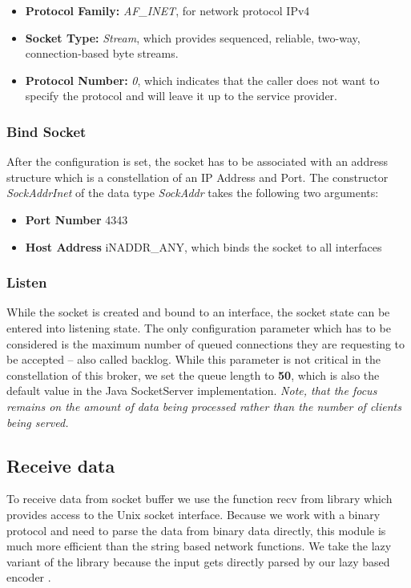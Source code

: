 \begin{itemize}
    \item {\bf Protocol Family:} \textit{AF\_INET}, for network protocol IPv4
    \item {\bf Socket Type:} \textit{Stream}, which provides sequenced, reliable, two-way, connection-based byte streams.
    \item {\bf Protocol Number:} \textit{0}, which indicates that the caller does not want to specify the protocol and will leave it up to the service provider.
\end{itemize}


\subsubsection{Bind Socket}

After the configuration is set, the socket has to be associated with an address
structure which is a constellation of an IP Address and Port. The constructor
\textit{SockAddrInet} of the data type \textit{SockAddr} takes the following
two arguments:

\begin{itemize}
    \item {\bf Port Number} 4343
    \item {\bf Host Address} iNADDR\_ANY, which binds the socket to all interfaces
\end{itemize}


\subsubsection{Listen}

While the socket is created and bound to an interface, the socket state can be
entered into listening state. The only configuration parameter which has to be
considered is the maximum number of queued connections they are requesting to
be accepted -- also called backlog. While this parameter is not critical in the
constellation of this broker, we set the queue length to \textbf{50}, which is
also the default value in the Java SocketServer implementation. \textit{Note,
that the focus remains on the amount of data being processed rather than the
number of clients being served.}

\subsection{Receive data}
\label{sec:impl-broker-socket-receive}
To receive data from socket buffer we use the function recv from
library which provides access to the Unix socket interface. Because we work
with a binary protocol and need to parse the data from binary data directly,
this module is much more efficient than the string based network functions. We
take the lazy variant of the library because the input gets directly parsed by
our lazy based encoder .

